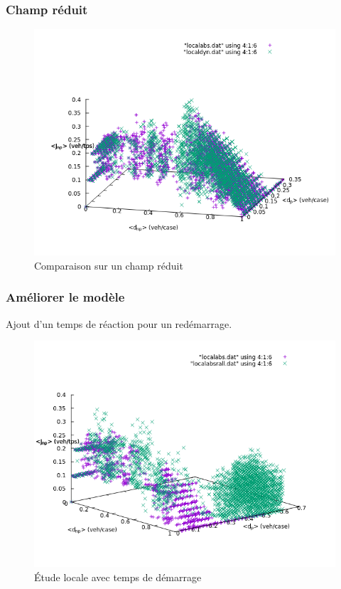 \documentclass[slidetop,11pt]{beamer}
\begin{document}
\begin{frame}
	\frametitle{Champ réduit}
		\begin{figure}
		\begin{center}
			\includegraphics[scale=0.4]{./diagrammes-fondamentaux/localabsdyn0wred}
		\end{center}
	\caption{Comparaison sur un champ réduit}
	\end{figure}
\end{frame}

\begin{frame}
	 \frametitle{Améliorer le modèle}
	 Ajout d'un temps de réaction pour un redémarrage.
	 \begin{figure}
	 	\begin{center}
	 		\includegraphics[scale=0.4]{./diagrammes-fondamentaux/localabs0w1w}
	 	\end{center}
	 	\caption{Étude locale avec temps de démarrage}
	 \end{figure}
\end{frame}
\end{document}
